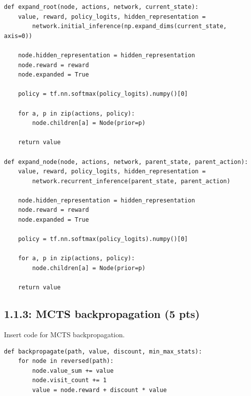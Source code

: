 \documentclass[12pt]{article}
\begin{document}
\begin{tcolorbox}[height=20cm, width=\textwidth]
\begin{center}
    \begin{verbatim}
def expand_root(node, actions, network, current_state):
    value, reward, policy_logits, hidden_representation =
        network.initial_inference(np.expand_dims(current_state, axis=0))

    node.hidden_representation = hidden_representation
    node.reward = reward
    node.expanded = True

    policy = tf.nn.softmax(policy_logits).numpy()[0]

    for a, p in zip(actions, policy):
        node.children[a] = Node(prior=p)

    return value

def expand_node(node, actions, network, parent_state, parent_action):
    value, reward, policy_logits, hidden_representation =
        network.recurrent_inference(parent_state, parent_action)

    node.hidden_representation = hidden_representation
    node.reward = reward
    node.expanded = True

    policy = tf.nn.softmax(policy_logits).numpy()[0]

    for a, p in zip(actions, policy):
        node.children[a] = Node(prior=p)

    return value
        \end{verbatim}
\end{center}
\end{tcolorbox}
\newpage

 
\subsection*{1.1.3: MCTS backpropagation (5 pts)}
Insert code for MCTS backpropagation.

\begin{tcolorbox}[height=22em, width=\textwidth]
\begin{center}
    \begin{verbatim}
def backpropagate(path, value, discount, min_max_stats):
    for node in reversed(path):
        node.value_sum += value
        node.visit_count += 1
        value = node.reward + discount * value
    \end{verbatim}
\end{center}
\end{tcolorbox}
    
\end{document}

